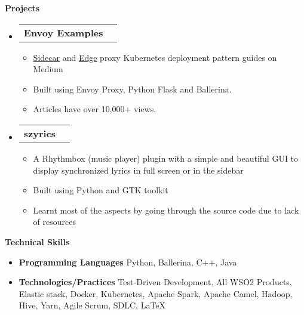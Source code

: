 \documentclass[letterpaper,12pt]{article}[leftmargin=*]
\makeatletter
\def \entryspacing {-0pt}
\renewcommand{\section}[2]{\vspace{5pt}
  \colorbox{secondary}{\color{white}\raggedbottom\normalsize\textbf{{#1}{\hspace{7pt}#2}}}
}
\newcommand{\resumeEntryStart}{\begin{itemize}[leftmargin=2.5mm]}
\newcommand{\resumeEntryEnd}{\end{itemize}\vspace{\entryspacing}}
\newcommand{\resumeItemListStart}{\begin{itemize}[leftmargin=4.5mm]}
\newcommand{\resumeItemListEnd}{\end{itemize}}
\newcommand{\resumeItem}[1]{
  \item\small{
    {#1 \vspace{-2pt}}
  }
}
\newcommand{\resumeEntryTD}[2]{
  \vspace{-1pt}\item[]
    \begin{tabularx}{0.97\textwidth}{X@{\hspace{60pt}}r}
      \textbf{\color{primary}#1} & {\firabook\color{accent}\small#2} \\
    \end{tabularx}\vspace{-6pt}
}
\newcommand{\resumeEntryS}[2]{
  \item[]\small{
    \textbf{\color{primary}#1 }{ #2 \vspace{-6pt}}
  }
}
\makeatother
\begin{document}
\section{\faFlask}{Projects}

  \resumeEntryStart
    \resumeEntryTD
      {Envoy Examples}{}
    \resumeItemListStart
      \resumeItem {\href{https://medium.com/@viggnah/how-to-deploy-envoy-as-a-sidecar-proxy-on-kubernetes-c3a3ad3935ee}{Sidecar} and \href{https://medium.com/@viggnah/how-to-deploy-envoy-as-an-edge-proxy-on-kubernetes-f1af78e1ebfb}{Edge} proxy Kubernetes deployment pattern guides on Medium}
      \resumeItem {Built using Envoy Proxy, Python Flask and Ballerina.}
      \resumeItem {Articles have over 10,000+ views.}
    \resumeItemListEnd
  \resumeEntryEnd

  \resumeEntryStart
    \resumeEntryTD
      {szyrics}{}
    \resumeItemListStart
      \resumeItem {A Rhythmbox (music player) plugin with a simple and beautiful GUI to display synchronized lyrics in full screen or in the sidebar}
      \resumeItem {Built using Python and GTK toolkit}
      \resumeItem {Learnt most of the aspects by going through the source code due to lack of resources}
    \resumeItemListEnd
  \resumeEntryEnd


\section{\faStar}{Technical Skills}
 \resumeEntryStart
  \resumeEntryS{Programming Languages} {Python, Ballerina, C++, Java}
  \resumeEntryS{Technologies/Practices} {Test-Driven Development, All WSO2 Products, Elastic stack, Docker, Kubernetes, Apache Spark, Apache Camel, Hadoop, Hive, Yarn, Agile Scrum, SDLC, \LaTeX}
 \resumeEntryEnd
 
\end{document}
